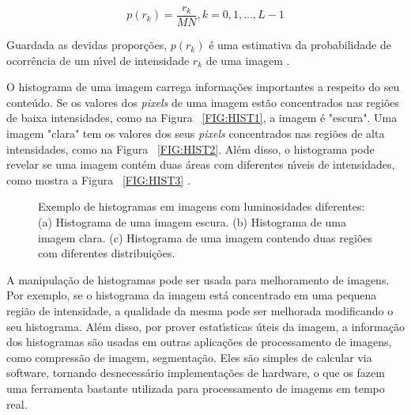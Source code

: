 \begin{equation}
p(r_k) = \frac{r_k}{MN}, k = 0,1,\ldots,L-1
\end{equation}

Guardada as devidas propor\c{c}\~{o}es, $p(r_k)$ \'{e} uma estimativa da probabilidade de ocorr\^{e}ncia de um n\'{\i}vel de intensidade $r_k$ de uma imagem \cite{GONZALEZ:2008}.

O histograma de uma imagem carrega informa\c{c}\~{o}es importantes a respeito do seu conte\'{u}do. Se os valores dos \emph{pixels} de uma imagem est\~{a}o concentrados nas regi\~{o}es de baixa intensidades, como na Figura ~\ref{FIG:HIST1}, a imagem \'{e} "escura". Uma imagem "clara" tem os valores dos seus \emph{pixels} concentrados nas regi\~{o}es de alta intensidades, como na Figura ~\ref{FIG:HIST2}. Al\'{e}m disso, o histograma pode revelar se uma imagem cont\'{e}m duas \'{a}reas com diferentes n\'{\i}veis de intensidades, como mostra a Figura ~\ref{FIG:HIST3} \cite{PITAS:2000}.

\begin{figure}[h]
\centering
{}
\caption[Exemplo de histogramas em imagens com luminosidades diferentes]{Exemplo de histogramas em imagens com luminosidades diferentes:(a) Histograma de uma imagem escura. (b) Histograma de uma imagem clara. (c) Histograma de uma imagem contendo duas regi\~{o}es com diferentes distribui\c{c}\~{o}es.} \label{FIG:HIST}
\end{figure}

A manipula\c{c}\~{a}o de histogramas pode ser usada para melhoramento de imagens. Por exemplo, se o histograma da imagem est\'{a} concentrado em uma pequena regi\~{a}o de intensidade, a qualidade da mesma pode ser melhorada modificando o seu histograma. Al\'{e}m disso, por prover estat\'{\i}sticas \'{u}teis da imagem, a informa\c{c}\~{a}o dos histogramas s\~{a}o usadas em outras aplica\c{c}\~{o}es de processamento de imagens, como compress\~{a}o de imagem, segmenta\c{c}\~{a}o. Eles s\~{a}o simples de calcular via software, tornando desnecess\'{a}rio implementa\c{c}\~{o}es de hardware, o que os fazem uma ferramenta bastante utilizada para processamento de imagems em tempo real\cite{GONZALEZ:2008}.


